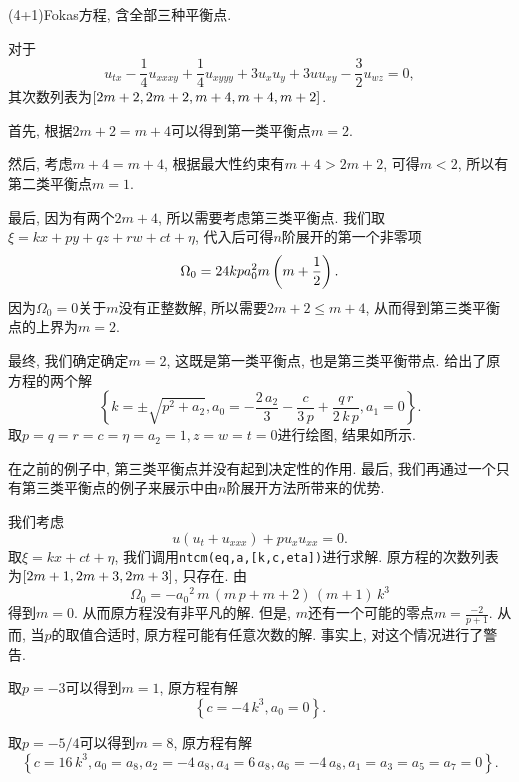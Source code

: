 \begin{example}(4+1)Fokas方程\CITEdaFokas{}, 含全部三种平衡点. 

对于
\begin{equation}
    u_{tx}-\frac{1}{4}u_{xxxy}+\frac{1}{4}u_{xyyy}+3u_xu_y+3uu_{xy}-\frac{3}{2}u_{wz}=0 ,
\end{equation}
其次数列表为$\left[2m+2,2m+2,m+4,m+4,m+2\right]$. 
\begin{compactitem}[\textbullet]
\item 首先, 根据$2m+2=m+4$可以得到第一类平衡点$m=2$.
\item 然后, 考虑$m+4=m+4$, 根据最大性约束有$m+4>2m+2$, 可得$m<2$, 所以有第二类平衡点$m=1$.
\item 最后, 因为有两个$2m+4$, 所以需要考虑第三类平衡点. 我们取$\xi=kx+py+qz+rw+ct+\eta$, 代入后可得$n$阶展开的第一个非零项
\begin{equation}
    \Omega_0 = 24kpa_0^2m\left(m+\frac{1}{2}\right). 
\end{equation}
因为$\Omega_0=0$关于$m$没有正整数解, 所以需要$2m+2\le m+4$, 从而得到第三类平衡点的上界为$m=2$.
\end{compactitem}
   
最终, 我们确定确定$m=2$, 这既是第一类平衡点, 也是第三类平衡带点. 给出了原方程的两个解
\begin{equation}
    \left\{ k=\pm \sqrt {{p}^{2}+{{a}_{2}}},{{a}_{0}}=-\frac{2\,{{a}_{2}}}{3}-\frac{c}{3\,p}+ \frac{q\,r}{2\,k\,p},{{a}_{1}}=0\right\} .
\end{equation}
取$p=q=r=c=\eta=a_2=1,z=w=t=0$进行绘图, 结果如所示. 
\end{example}

在之前的例子中, 第三类平衡点并没有起到决定性的作用. 最后, 我们再通过一个只有第三类平衡点的例子来展示中由$n$阶展开方法所带来的优势.

\begin{example}
我们考虑
\begin{equation}
    u(u_t+u_{xxx})+pu_x u_{xx}=0.
\end{equation}
取$\xi=kx+ct+\eta$, 我们调用\verb|ntcm(eq,a,[k,c,eta])|进行求解. 原方程的次数列表为$\left[2m+1,2m+3,2m+3\right]$, 只存在\BPthree{}. 由
\begin{equation}
    \Omega_0=-{{{a}_{0}}}^{2}\,m\,\left( m\,p+m+2\right) \,\left( m+1\right) \,{k}^{3}
\end{equation}
得到$m=0$. 从而原方程没有非平凡的解. 但是, $m$还有一个可能的零点$m=\frac{-2}{p+1}$. 从而, 当$p$的取值合适时, 原方程可能有任意次数的解. 事实上, 对这个情况进行了警告. 

取$p=-3$可以得到$m=1$, 原方程有解 
\begin{equation}
    \left\{ c=-4\,{k}^{3},{{a}_{0}}=0\right\} .
\end{equation}

取$p=-5/4$可以得到$m=8$, 原方程有解 
\begin{equation}
    \left\{ c=16\,{k}^{3},{{a}_{0}}={{a}_{8}},{{a}_{2}}=-4\,{{a}_{8}},{{a}_{4}}=6\,{{a}_{8}},{{a}_{6}}=-4\,{{a}_{8}},a_1=a_3=a_5=a_7=0\right\} .
\end{equation}
\end{example}

